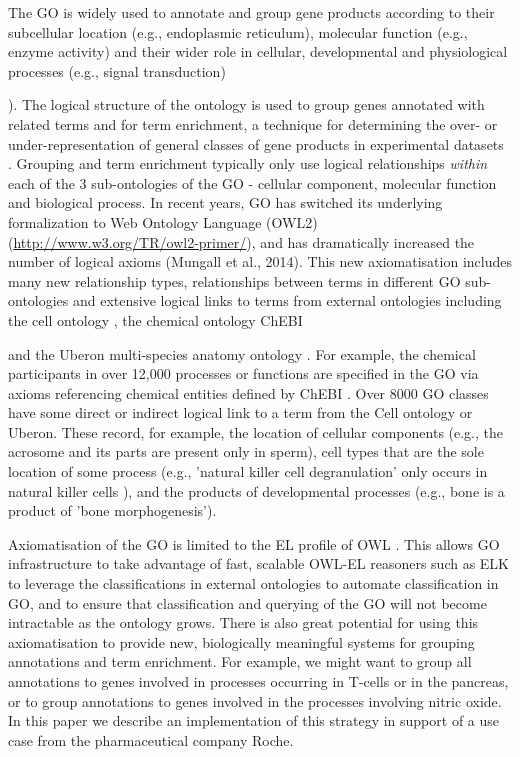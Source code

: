 \documentclass[runningheads,a4paper]{llncs}
\begin{document}
The \acf{GO} is widely used to annotate and group gene products according to their subcellular location (e.g., endoplasmic reticulum), molecular function (e.g., enzyme activity) and their wider role in cellular, developmental and physiological processes (e.g., signal transduction) {\cite{GO2015}). The logical structure of the ontology is used to group genes annotated with related terms and for term enrichment, a technique for determining the over- or under-representation of general classes of gene products in experimental datasets \cite{Shah2012}. Grouping and term enrichment typically only use logical relationships \textit{within} each of the 3 sub-ontologies of the \ac{GO} - cellular component, molecular function and biological process.
%
In recent years, \ac{GO} has switched its underlying formalization to Web Ontology Language (OWL2) (\url{http://www.w3.org/TR/owl2-primer/}), and has dramatically increased the number of logical axioms (Mungall et al., 2014). This new axiomatisation includes many new relationship types, relationships between terms in different \ac{GO} sub-ontologies and extensive logical links to terms from external ontologies including the cell ontology \cite{Meehan2011}, the chemical ontology ChEBI {\cite{Hastings2013} and the Uberon multi-species anatomy ontology \cite{Haendel2014}.  For example, the chemical participants in over 12,000 processes or functions are specified in the \ac{GO} via axioms referencing chemical entities defined by ChEBI \cite{Hill2013}. Over 8000 \ac{GO} classes have some direct or indirect logical link to a term from the Cell ontology or Uberon. These record, for example, the location of cellular components (e.g., the acrosome and its parts are present only in sperm), cell types that are the sole location of some process (e.g., 'natural killer cell degranulation' only occurs in natural killer cells ), and the products of developmental processes (e.g., bone is a product of 'bone morphogenesis').

Axiomatisation of the \ac{GO} is limited to the EL profile of OWL \cite{Mungall2014}. This allows \ac{GO} infrastructure to take advantage of fast, scalable OWL-EL reasoners such as ELK \cite{kazakov2012} to leverage the classifications in external ontologies to automate classification in \ac{GO}, and to ensure that classification and querying of the \ac{GO} will not become intractable as the ontology grows.  There is also great potential for using this axiomatisation to provide new, biologically meaningful systems for grouping annotations and term enrichment.  For example, we might want to group all annotations to genes involved in processes occurring in T-cells or in the pancreas, or to group annotations to genes involved in the processes involving nitric oxide.  In this paper we describe an implementation of this strategy in support of a use case from the pharmaceutical company Roche.

}}
\end{document}
